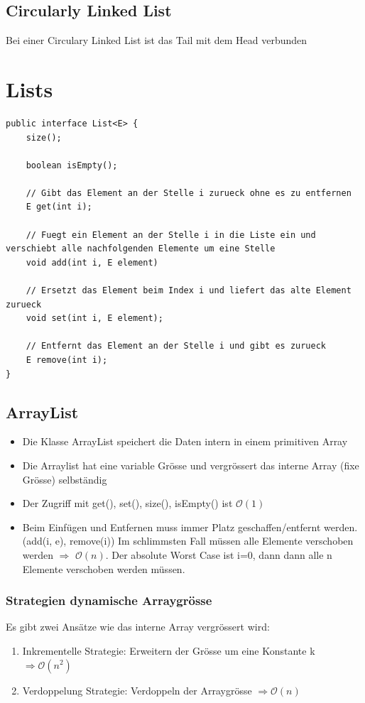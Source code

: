 \subsection{Circularly Linked List}
Bei einer Circulary Linked List ist das Tail mit dem Head verbunden

\section{Lists}

\begin{lstlisting}
public interface List<E> {
	size();
	
	boolean isEmpty();
	
	// Gibt das Element an der Stelle i zurueck ohne es zu entfernen
	E get(int i);

	// Fuegt ein Element an der Stelle i in die Liste ein und verschiebt alle nachfolgenden Elemente um eine Stelle
	void add(int i, E element)
	
	// Ersetzt das Element beim Index i und liefert das alte Element zurueck
	void set(int i, E element);	
		
	// Entfernt das Element an der Stelle i und gibt es zurueck
	E remove(int i);
}
\end{lstlisting}

\subsection{ArrayList}
\begin{itemize}
	\item Die Klasse ArrayList speichert die Daten intern in einem primitiven Array
	\item Die Arraylist hat eine variable Grösse und vergrössert das interne Array (fixe Grösse) selbständig
	\item Der Zugriff mit get(), set(), size(), isEmpty() ist $\mathcal{O}(1)$
	\item Beim Einfügen und Entfernen muss immer Platz geschaffen/entfernt werden. (add(i, e), remove(i)) Im schlimmsten Fall müssen alle Elemente verschoben werden $\Rightarrow$ $\mathcal{O}(n)$. Der absolute Worst Case ist i=0, dann dann alle n Elemente verschoben werden müssen.
\end{itemize}

\subsubsection{Strategien dynamische Arraygrösse}
Es gibt zwei Ansätze wie das interne Array vergrössert wird:
\begin{enumerate}
	\item Inkrementelle Strategie: Erweitern der Grösse um eine Konstante k  $\Rightarrow \mathcal{O}(n^2)$
	\item Verdoppelung Strategie: Verdoppeln der Arraygrösse $\Rightarrow \mathcal{O}(n)$
\end{enumerate}


